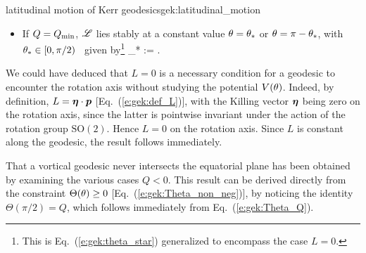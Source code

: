 \begin{tprop}{latitudinal motion of Kerr geodesics}{gek:latitudinal_motion}
\begin{itemize}
or at $\th=\pi-\th_{\rm v}$ and $\th=\pi-\th_{\rm m}$ (Southern hemisphere), where
$\th_{\rm m}$ and $\th_{\rm v}$ are given by Eqs.~(\ref{e:gek:th0_E_gt_mu}) and
(\ref{e:gek:th1}) respectively; if $L=0$,
$\Li$ oscillates about the rotation axis, with a $\th$-turning point at
$\th=\th_{\rm v}$ or $\th = \pi - \th_{\rm v}$, where $\th_{\rm v}$
is given by Eq.~(\ref{e:gek:th0_L_zero}).
\item If $Q = Q_{\rm min}$, $\Li$ lies stably at a constant value $\theta=\theta_*$
or $\theta = \pi - \theta_*$, with $\theta_*\in [0, \pi/2)$%
\ given by\footnote{This is Eq.~(\ref{e:gek:theta_star})
generalized to encompass the case $L=0$.}
\be
     \th_* := \arcsin{} .
\ee
\end{itemize}
\end{tprop}

\begin{remark}
We could have deduced that $L=0$ is a necessary condition for a geodesic
to encounter the rotation axis without studying the potential $V(\theta)$. Indeed,
by definition, $L = \bm{\eta}\cdot\bm{p}$ [Eq.~(\ref{e:gek:def_L})], with the Killing
vector $\bm{\eta}$ being zero on the rotation axis, since the latter is
pointwise invariant under the action of the rotation group $\mathrm{SO}(2)$.
Hence $L=0$ on the rotation axis. Since $L$ is constant along the geodesic,
the result follows immediately.
\end{remark}

\begin{remark}
That a vortical geodesic never intersects the equatorial plane has been
obtained by examining the various cases $Q<0$. This result can be derived
directly from the constraint $\Theta(\theta)\geq 0$ [Eq.~(\ref{e:gek:Theta_non_neg})],
by noticing the identity
$\Theta(\pi/2) = Q$, which follows immediately from Eq.~(\ref{e:gek:Theta_Q}).
\end{remark}

